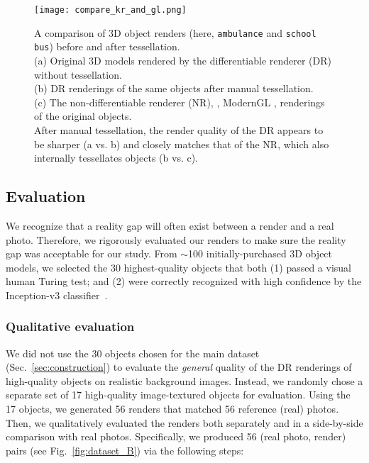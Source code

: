 \documentclass[10pt,twocolumn,letterpaper]{article}
\newcommand{\class}[1]{{\small\texttt{#1}}}
\begin{document}
\begin{figure}[h]
	\begin{center}
		\texttt{[image: compare\_kr\_and\_gl.png]}
	\end{center}
	\vspace*{-0.3cm}
	\caption{A comparison of 3D object renders (here, \class{ambulance} and \class{school bus}) before and after tessellation.
		\\(a) Original 3D models rendered by the differentiable renderer (DR) \cite{kato2018neural} without tessellation.
		\\(b) DR renderings of the same objects after manual tessellation.
		\\(c) The non-differentiable renderer (NR), \ie, ModernGL \cite{modernGL}, renderings of the original objects.
		\\After manual tessellation, the render quality of the DR appears to be sharper (a vs. b) and closely matches that of the NR, which also internally tessellates objects (b vs. c).	
		}
	
	\label{fig:compare_tessellation}
\end{figure}


\subsection{Evaluation}
\label{sec:evaluation}

We recognize that a reality gap will often exist between a render and a real photo.
Therefore, we rigorously evaluated our renders to make sure the reality gap was acceptable for our study.
From $\sim$100 initially-purchased 3D object models, we selected the 30 highest-quality objects that both (1) passed a visual human Turing test; and (2) were correctly recognized with high confidence by the Inception-v3 classifier~\cite{szegedy2016rethinking}. 


\subsubsection{Qualitative evaluation} 
\label{sec:qualitative_eval}

We did not use the 30 objects chosen for the main dataset (Sec.~\ref{sec:construction}) to evaluate the \emph{general} quality of the DR renderings of high-quality objects on realistic background images.
Instead, we randomly chose a separate set of 17 high-quality image-textured objects for evaluation.
Using the 17 objects, we generated 56 renders that matched 56 reference (real) photos.
Then, we qualitatively evaluated the renders both separately and in a side-by-side comparison with real photos.
Specifically, we produced 56 (real photo, render) pairs (see Fig.~\ref{fig:dataset_B}) via the following steps: 
\end{document}

